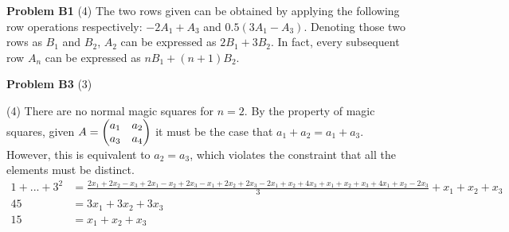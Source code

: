 \documentclass[12pt]{article}
\begin{document}
\vspace {0.25cm} \noindent
{\bf Problem B1}
(4)
The two rows given can be obtained by applying the following row operations respectively: 
$-2A_1+A_3$ and $0.5(3A_1 - A_3)$. Denoting those two rows as $B_1$ and $B_2$, 
$A_2$ can be expressed as $2B_1 + 3B_2$. In fact, every subsequent row $A_n$ can be 
expressed as $nB_1 + (n+1)B_2$. 

\vspace {0.25cm} \noindent
{\bf Problem B3}
(3)

(4)
There are no normal magic squares for $n=2$. By the property of magic squares, given 
$A = \begin{pmatrix}
  a_1 & a_2\cr a_3 & a_4
\end{pmatrix}$
it must be the case that $a_1 + a_2 = a_1 + a_3$. However, this is equivalent to $a_2 = a_3$, 
which violates the constraint that all the elements must be distinct.
\begin{align*}
  1 + ... + 3^2 &= \frac{2x_1 + 2x_2 - x_3 + 2x_1 - x_2 + 2x_3 - x_1 + 2x_2 + 2x_3 
  - 2x_1 + x_2 + 4x_3 + x_1 + x_2 + x_3 + 4x_1 + x_2 - 2x_3}{3} + x_1 + x_2 + x_3\\
  45 &= 3x_1 + 3 x_2 + 3x_3\\
  15 &= x_1 + x_2 + x_3
\end{align*}
\end{document}

